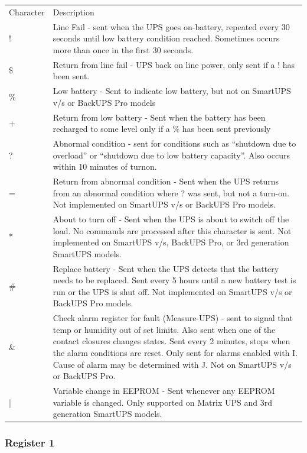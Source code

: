 {{{{{{{{{{{{{{{{{\begin{longtable}{ll}
{Character} & {Description 
 } \\
{!} & {Line Fail - sent when the UPS goes on-battery, repeated every 30
seconds until low battery condition reached. Sometimes occurs more than once
in the first 30 seconds. 
 } \\
{\$} & {Return from line fail - UPS back on line power, only sent if a ! has
been sent. 
 } \\
{\%} & {Low battery - Sent to indicate low battery, but not on SmartUPS v/s or
BackUPS Pro models 
 } \\
{+} & {Return from low battery - Sent when the battery has been recharged to
some level only if a \% has been sent previously 
 } \\
{?} & {Abnormal condition - sent for conditions such as ``shutdown due to
overload'' or ``shutdown due to low battery capacity''. Also occurs within 10
minutes of turnon. 
 } \\
{=} & {Return from abnormal condition - Sent when the UPS returns from an
abnormal condition where ? was sent, but not a turn-on. Not implemented on
SmartUPS v/s or BackUPS Pro models. 
 } \\
{*} & {About to turn off - Sent when the UPS is about to switch off the load.
No commands are processed after this character is sent. Not implemented on
SmartUPS v/s, BackUPS Pro, or 3rd generation SmartUPS models. 
 } \\
{\#} & {Replace battery - Sent when the UPS detects that the battery needs to
be replaced. Sent every 5 hours until a new battery test is run or the UPS is
shut off. Not implemented on SmartUPS v/s or BackUPS Pro models. 
 } \\
{\&} & {Check alarm register for fault (Measure-UPS) - sent to signal that
temp or humidity out of set limits. Also sent when one of the contact closures
changes states. Sent every 2 minutes, stops when the alarm conditions are
reset. Only sent for alarms enabled with I. Cause of alarm may be determined
with J. Not on SmartUPS v/s or BackUPS Pro. 
 } \\
{|} & {Variable change in EEPROM - Sent whenever any EEPROM variable is
changed. Only supported on Matrix UPS and 3rd generation SmartUPS models.  
}

\end{longtable}

\label{Register-1}

\subsubsection*{Register 1}

}}}}}}}}}}}}}}}}}
